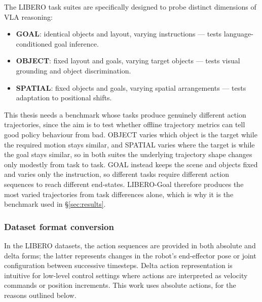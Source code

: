 \documentclass[english,12pt,a4paper,pdftex,elec,utf8]{aaltothesis}
\begin{document}
The LIBERO task suites are specifically designed to probe distinct dimensions of VLA reasoning:
\begin{itemize}
    \item \textbf{GOAL}: identical objects and layout, varying instructions --- tests language-conditioned goal inference.
    \item \textbf{OBJECT}: fixed layout and goals, varying target objects --- tests visual grounding and object discrimination.
    \item \textbf{SPATIAL}: fixed objects and goals, varying spatial arrangements --- tests adaptation to positional shifts.
\end{itemize}

This thesis needs a benchmark whose tasks produce genuinely different action trajectories, since the aim is to test whether offline trajectory metrics can tell good policy behaviour from bad. OBJECT varies which object is the target while the required motion stays similar, and SPATIAL varies where the target is while the goal stays similar, so in both suites the underlying trajectory shape changes only modestly from task to task. GOAL instead keeps the scene and objects fixed and varies only the instruction, so different tasks require different action sequences to reach different end-states. LIBERO-Goal therefore produces the most varied trajectories from task differences alone, which is why it is the benchmark used in \S\ref{sec:results}.

\subsubsection{Dataset format conversion}
In the LIBERO datasets, the action sequences are provided in both absolute and delta forms; the latter represents changes in the robot's end-effector pose or joint configuration between successive timesteps. Delta action representation is intuitive for low-level control settings where actions are interpreted as velocity commands or position increments. This work uses absolute actions, for the reasons outlined below.
\end{document}
